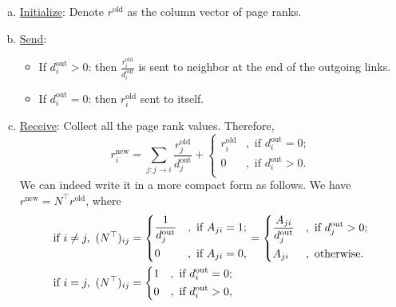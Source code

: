 \begin{enumerate}[(a)]
	\item \hyperref[algo:basic-page-rank-algorithm:initialize]{Initialize}: Denote \(r^{\text{old}}\) as the column vector of page ranks.
	\item \hyperref[algo:basic-page-rank-algorithm:send]{Send}:
	      \begin{itemize}
		      \item If \(d^{\text{out}}_i > 0\): then \(\frac{r_{i}^{\text{old}}}{d_{i}^{\text{out}}}\) is sent to neighbor at the end of the outgoing links.
		      \item If \(d_{i}^{\text{out}} = 0\): then \(r_{i}^{\text{old}}\) sent to itself.
	      \end{itemize}
	\item \hyperref[algo:basic-page-rank-algorithm:receive]{Receive}: Collect all the page rank values. Therefore,
	      \[
		      r_{i}^{\text{new}} = \sum\limits_{j:j\to i}\frac{r_{j}^{\text{old}}}{d_{j}^{\text{out}}}+\begin{cases}
			      r_{i}^{\text{old}} & , \text{ if }d_{i}^{\text{out}} = 0; \\
			      0                  & , \text{ if }d_{i}^{\text{out}} > 0. \\
		      \end{cases}
	      \]
	      We can indeed write it in a more compact form as follows. We have \(r^{\text{new}} = N^{\top} r^{\text{old}}\), where
	      \[
		      \begin{alignedat}{3}
			      &\text{if }i\neq  j,\ (N^{\top})_{ij} = \begin{dcases}
				      \frac{1}{d_{j}^{\text{out}}} & , \text{ if } A_{ji} = 1; \\
				      0                            & , \text{ if } A_{ji} = 0, \\
			      \end{dcases} &&= \begin{dcases}
				      \frac{A_{ji}}{d_{j}^{\text{out}}} & , \text{ if }d_{j}^{\text{out}}>0; \\
				      A_{ji}                            & , \text{ otherwise}.               \\
			      \end{dcases}\\
			      &\text{if }i = j,\ (N^{\top})_{ij} = \begin{dcases}
				      1 & , \text{ if } d_{i}^{\text{out}} = 0; \\
				      0 & , \text{ if } d_{i}^{\text{out}} > 0, \\

\end{dcases}
\end{alignedat}\]
\end{enumerate}
